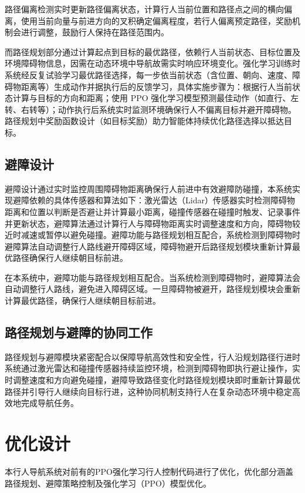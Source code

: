 	路径偏离检测实时更新路径偏离状态，计算行人当前位置和路径点之间的横向偏离，使用当前向量与前进方向的叉积确定偏离程度，若行人偏离预定路径，奖励机制会进行调整，鼓励行人保持在路径范围内。
	
	而路径规划部分通过计算起点到目标的最优路径，依赖行人当前状态、目标位置及环境障碍物信息，因需在动态环境中导航故需实时响应环境变化。强化学习训练时系统经反复试验学习最优路径选择，每一步依当前状态（含位置、朝向、速度、障碍物距离等）生成动作并据执行后的反馈学习，具体实施步骤为：根据行人当前状态计算与目标的方向和距离；使用 PPO 强化学习模型预测最佳动作（如直行、左转、右转等）；动作执行后系统实时监测环境确保行人不偏离目标并避开障碍物。路径规划中奖励函数设计（如目标奖励）助力智能体持续优化路径选择以抵达目标。
	
	\subsection{避障设计}
	
	避障设计通过实时监控周围障碍物距离确保行人前进中有效避障防碰撞，本系统实现避障依赖的具体传感器和算法如下：激光雷达（Lidar）传感器实时检测障碍物距离和位置以判断是否避让并计算最小距离，碰撞传感器在碰撞时触发、记录事件并更新状态，避障算法通过计算行人与障碍物距离实时调整速度和方向，障碍物较近时减速或暂停以避免碰撞。避障功能与路径规划相互配合，系统检测到障碍物时避障算法自动调整行人路线避开障碍区域，障碍物避开后路径规划模块重新计算最优路径确保行人继续朝目标前进。
	
	在本系统中，避障功能与路径规划相互配合。当系统检测到障碍物时，避障算法会自动调整行人路线，避免进入障碍区域。一旦障碍物被避开，路径规划模块会重新计算最优路径，确保行人继续朝目标前进。
	
	\subsection{路径规划与避障的协同工作}
	
	路径规划与避障模块紧密配合以保障导航高效性和安全性，行人沿规划路径行进时系统通过激光雷达和碰撞传感器持续监控环境，检测到障碍物即执行避让操作，实时调整速度和方向避免碰撞，避障导致路径变化时路径规划模块即时重新计算最优路径并引导行人继续向目标行进，这种协同机制支持行人在复杂动态环境中稳定高效地完成导航任务。
	
	\section{优化设计}
	
	本行人导航系统对前有的PPO强化学习行人控制代码进行了优化，优化部分涵盖路径规划、避障策略控制及强化学习（PPO）模型优化。
	
